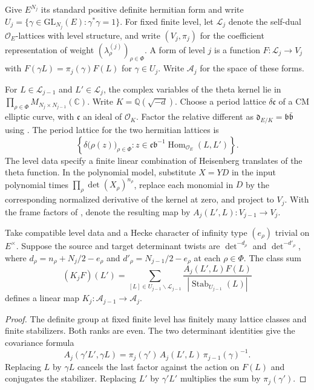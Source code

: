 Give $E^{N_j}$ its standard positive definite hermitian form and write
$U_j=\{\gamma\in\mathrm{GL}_{N_j}(E):\gamma^*\gamma=1\}$.
For fixed finite level, let $\mathcal L_j$ denote the self-dual
$\mathcal O_E$-lattices with level structure, and write $(V_j,\pi_j)$
for the coefficient representation of weight
$(\lambda^{(j)}_\rho)_{\rho\in\Phi}$. A form of level $j$ is a
function $F\colon\mathcal L_j\to V_j$ with
$F(\gamma L)=\pi_j(\gamma)F(L)$ for $\gamma\in U_j$.
Write $\mathcal A_j$ for the space of these forms.

For $L\in\mathcal L_{j-1}$ and $L'\in\mathcal L_j$, the complex
variables of the theta kernel lie in
$\prod_{\rho\in\Phi}M_{N_j\times N_{j-1}}(\mathbb C)$.
Write $K=\mathbb Q(\sqrt{-d})$. Choose a period lattice
$\delta\mathfrak c$ of a CM elliptic curve, with $\mathfrak c$ an
ideal of $\mathcal O_K$. Factor the relative different as
$\mathfrak d_{E/K}=\mathfrak b\bar{\mathfrak b}$ using
\citep[Lemma~7.1]{adriazola-grh}. The period lattice for the two
hermitian lattices is
\[
 \left\{\delta\bigl(\rho(z)\bigr)_{\rho\in\Phi}:
 z\in\mathfrak c\mathfrak b^{-1}
           \operatorname{Hom}_{\mathcal O_E}(L,L')\right\}.
\]
The level data specify a finite linear combination of Heisenberg
translates of the theta function. In the polynomial model, substitute
$X=YD$ in the input polynomial times $\prod_\rho\det(X_\rho)^{n_\rho}$,
replace each monomial in $D$ by the corresponding normalized derivative of the
kernel at zero, and project to $V_j$. With the frame factors of
\citep[Eq.~(7.4)]{adriazola-grh}, denote the resulting map by
$A_j(L',L)\colon V_{j-1}\to V_j$.

\begin{proposition}\label{prop:chain-lift}
Take compatible level data and a Hecke character of infinity type
$(e_\rho)$ trivial on $E^\times$. Suppose the source and target
determinant twists are $\det^{-d_\rho}$ and $\det^{-d'_\rho}$, where
$d_\rho=n_\rho+N_j/2-e_\rho$ and $d'_\rho=N_{j-1}/2-e_\rho$ at
each $\rho\in\Phi$. The class sum
\begin{equation}\label{eq:chain-class-sum}
 (K_jF)(L')=
 \sum_{[L]\in U_{j-1}\backslash\mathcal L_{j-1}}
 \frac{A_j(L',L)F(L)}{|\operatorname{Stab}_{U_{j-1}}(L)|}
\end{equation}
defines a linear map $K_j\colon\mathcal A_{j-1}\to\mathcal A_j$.
\end{proposition}

\begin{proof}
The definite group at fixed finite level has finitely many lattice
classes and finite stabilizers. Both ranks are even. The two
determinant identities give the covariance formula
\citep[Proposition~7.9(iii)]{adriazola-grh}
\[
 A_j(\gamma'L',\gamma L)
    =\pi_j(\gamma')\,A_j(L',L)\,\pi_{j-1}(\gamma)^{-1}.
\]
Replacing $L$ by $\gamma L$ cancels the last factor against the action
on $F(L)$ and conjugates the stabilizer. Replacing $L'$ by $\gamma'L'$
multiplies the sum by $\pi_j(\gamma')$.
\end{proof}

